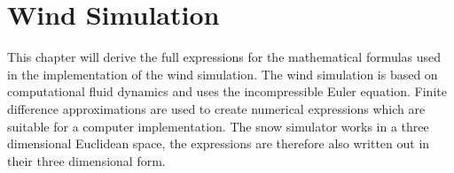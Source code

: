 \chapter{Wind Simulation}
\label{chap:windsim}

This chapter will derive the full expressions for the mathematical formulas 
used in the implementation of the wind simulation. The wind simulation is 
based on computational fluid dynamics and uses the incompressible Euler 
equation. Finite difference approximations are used to create numerical 
expressions which are suitable for a computer implementation. The snow simulator 
works in a three dimensional Euclidean space, the expressions are therefore also 
written out in their three dimensional form. 

